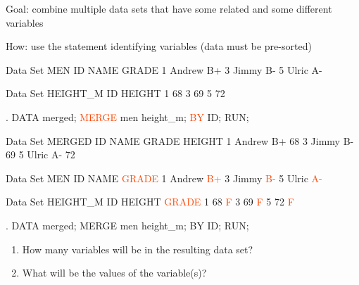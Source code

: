 \begin{frame}[fragile]
\bi
\item[Goal:] \small{combine multiple data sets that have some related and some different variables}
\item[How:] \small{use the  statement  identifying variables (data must be pre-sorted)}
\ei
{}
\footnotesize
\begin{craw}{.1}{Data Set MEN}
ID   NAME     GRADE
1    Andrew     B+
3    Jimmy      B-
5    Ulric      A-
\end{craw}
\begin{craw}{.1}{Data Set HEIGHT\_M}
ID HEIGHT
1  68
3  69
5  72
\end{craw}
\vspace{.0in}
\emp
{}
\begin{code}{.}
DATA merged;
  \textcolor{OrangeRed}{MERGE} men height\_m;
  \textcolor{OrangeRed}{BY} ID;
RUN;
\end{code}
\begin{craw}{.1}{Data Set MERGED}
ID NAME   GRADE HEIGHT
1  Andrew  B+    68
3  Jimmy   B-    69
5  Ulric   A-    72
\end{craw}
\emp
\vspace{.0in}
\end{frame}



\begin{frame}[fragile]
\footnotesize
\begin{craw}{.1}{Data Set MEN}
ID   NAME     \textcolor{OrangeRed}{GRADE}
1    Andrew   \textcolor{OrangeRed}{B+}
3    Jimmy    \textcolor{OrangeRed}{B-}
5    Ulric    \textcolor{OrangeRed}{A-}
\end{craw}
\begin{craw}{.1}{Data Set HEIGHT\_M}
ID HEIGHT \textcolor{OrangeRed}{GRADE}
1  68     \textcolor{OrangeRed}{F}
3  69     \textcolor{OrangeRed}{F}
5  72     \textcolor{OrangeRed}{F}
\end{craw}
\vspace{.0in}
\emp
{}
\begin{code}{.}
DATA merged;
   MERGE men height\_m;
   BY ID;
RUN;
\end{code}
\oyo
\begin{enumerate}
\item How many variables will be in the resulting data set?
\item What will be the values of the  variable(s)?
\item[]
\end{enumerate}
\emp
\vspace{.0in}
\end{frame}


